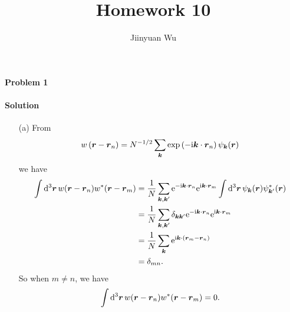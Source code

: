 \documentclass[hyperref, a4paper]{article}
\title{Homework 10}
\author{Jiinyuan Wu}
\newcommand*{\ii}{\mathrm{i}}
\newcommand*{\ee}{\mathrm{e}}
\begin{document}
\maketitle

\paragraph{Problem 1}

\paragraph{Solution}  \begin{itemize}
\item[(a)] From 
\begin{equation}
    w\left(\vb*{r}-\vb*{r}_n\right)=N^{-1 / 2} \sum_{\vb*{k}} \exp \left(- \ii \vb*{k} \cdot \vb*{r}_n\right) \psi_{\vb*{k}}(\vb*{r})
\end{equation}
we have 
\[
    \begin{aligned}
        \int \dd[3]{\vb*{r}} w(\vb*{r} - \vb*{r}_n) w^*(\vb*{r} - \vb*{r}_m)
        &= \frac{1}{N} \sum_{\vb*{k}, \vb*{k}'} 
        \ee^{- \ii \vb*{k} \cdot \vb*{r}_n} \ee^{\ii \vb*{k} \cdot \vb*{r}_m}
        \int \dd[3]{\vb*{r}} \psi_{\vb*{k}}(\vb*{r}) \psi_{\vb*{k}'}^*(\vb*{r}) \\
        &= \frac{1}{N} \sum_{\vb*{k}, \vb*{k}'} \delta_{\vb*{k} \vb*{k}'} 
        \ee^{- \ii \vb*{k} \cdot \vb*{r}_n} \ee^{\ii \vb*{k} \cdot \vb*{r}_m} \\
        &= \frac{1}{N} \sum_{\vb*{k}} \ee^{\ii \vb*{k} \cdot (\vb*{r}_m - \vb*{r}_n)} \\
        &= \delta_{mn}.
    \end{aligned}
\]
So when $m \neq n$, we have 
\begin{equation}
    \int \dd[3]{\vb*{r}} w(\vb*{r} - \vb*{r}_n) w^*(\vb*{r} - \vb*{r}_m) = 0.
\end{equation}


\end{itemize}
\end{document}
